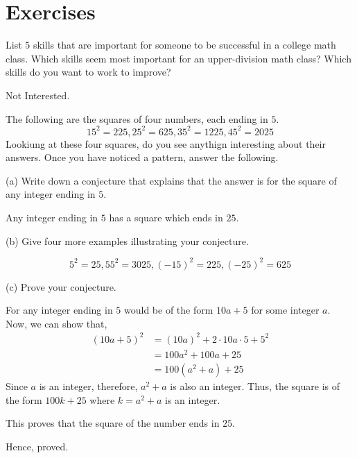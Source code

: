 \section*{Exercises}

\begin{problem}
	List $5$ skills that are important for someone to be successful in a college math class. Which skills seem most important for an upper-division math class? Which skills do you want to work to improve?
\end{problem}
\begin{solution}Not Interested.\end{solution}

\begin{problem}
	The following are the squares of four numbers, each ending in $5$.
	$$15^2 = 225, 25^2 = 625, 35^2 = 1225, 45^2 = 2025$$
	Lookiung at these four squares, do you see anythign interesting about their answers. Once you have noticed a pattern, answer the following.

	(a) Write down a conjecture that explains that the answer is for the square of any integer ending in $5$.

	\begin{solution}
		\begin{named}[Conjecture]
			Any integer ending in $5$ has a square which ends in $25$.
		\end{named}
	\end{solution}

	(b) Give four more examples illustrating your conjecture.
	\begin{solution}
		$$5^2 = 25, 55^2 = 3025, (-15)^2 = 225, (-25)^2 = 625$$
	\end{solution}

	(c) Prove your conjecture.
	\begin{solution}
		For any integer ending in $5$ would be of the form $10a+5$ for some integer $a$. Now, we can show that,
		$$
		\begin{align}
			(10a+5)^2 &= (10a)^2 + 2 \cdot 10a \cdot 5 + 5^2 \\
				&= 100a^2 + 100a + 25 \\
				&= 100(a^2+a) + 25
		\end{align}
		$$
		Since $a$ is an integer, therefore, $a^2 + a$ is also an integer.
		Thus, the square is of the form $100k+25$ where $k = a^2+a$ is an integer.

		This proves that the square of the number ends in $25$.

		Hence, proved.
	\end{solution}
\end{problem}

